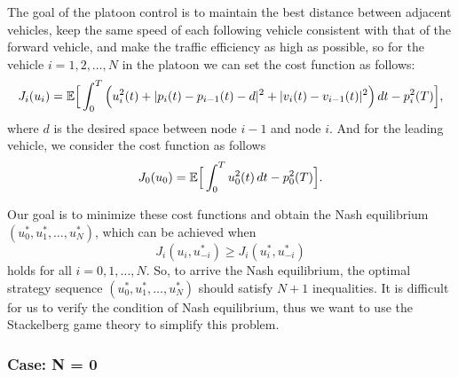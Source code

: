 \documentclass{article}
\begin{document}
The goal of the platoon control is to maintain the best distance between adjacent vehicles, keep the same speed of each following vehicle consistent with that of the forward vehicle, and make the traffic efficiency as high as possible, so for the vehicle $i = 1, 2, \dots, N$ in the platoon we can set the cost function as follows:
\begin{equation} \label{eq: cost function2}
    J_{i} (u_{i}) = \mathbb{E} \Big{[} \int_{0}^{T} \Big{(} u_{i}^{2}(t) + |p_{i}(t) - p_{i-1}(t) - d|^{2} + |v_{i}(t) - v_{i - 1}(t)|^{2} \Big{)} \, d t - p_{i}^{2}(T) \Big{]},
\end{equation}
where $d$ is the desired space between node $i-1$ and node $i$. And for the leading vehicle, we consider the cost function as follows
\begin{equation} \label{eq: cost function1}
    J_{0} (u_{0}) = \mathbb{E} \Big{[} \int_{0}^{T}  u_{0}^{2}(t) \, d t - p_{0}^{2}(T) \Big{]}.
\end{equation}

Our goal is to minimize these cost functions and obtain the Nash equilibrium $(u_{0}^{*}, u_{1}^{*}, \dots, u_{N}^{*})$, which can be achieved when 
\begin{equation} \label{eq: Nash equilibrium}
    J_{i}(u_{i}, u_{-i}^{*}) \geq J_{i}(u_{i}^{*}, u_{-i}^{*})
\end{equation}
holds for all $i = 0, 1, \dots, N$. So, to arrive the Nash equilibrium, the optimal strategy sequence $(u_{0}^{*}, u_{1}^{*}, \dots, u_{N}^{*})$ should satisfy $N+1$ inequalities. It is difficult for us to verify the condition of Nash equilibrium, thus we want to use the Stackelberg game theory to simplify this problem.

\subsubsection{Case: N = 0}
\end{document}
